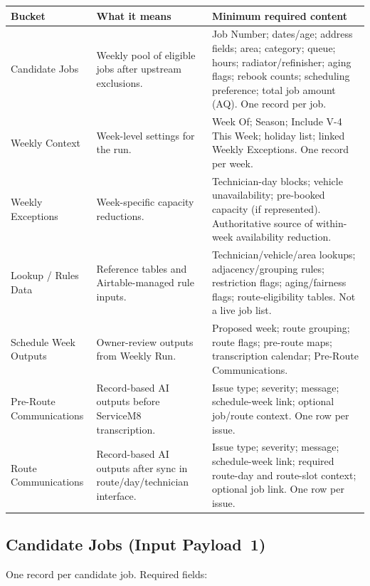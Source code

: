 \documentclass[12pt]{article}
\begin{document}
\medskip
{\small
\begin{longtable}{lp{5cm}p{5cm}}
\toprule
\textbf{Bucket} & \textbf{What it means} & \textbf{Minimum required content} \\
\midrule
Candidate Jobs & Weekly pool of eligible jobs after upstream exclusions. & Job Number; dates/age; address fields; area; category; queue; hours; radiator/refinisher; aging flags; rebook counts; scheduling preference; total job amount (AQ). One record per job. \\
Weekly Context & Week-level settings for the run. & Week Of; Season; Include V-4 This Week; holiday list; linked Weekly Exceptions. One record per week. \\
Weekly Exceptions & Week-specific capacity reductions. & Technician-day blocks; vehicle unavailability; pre-booked capacity (if represented). Authoritative source of within-week availability reduction. \\
Lookup / Rules Data & Reference tables and Airtable-managed rule inputs. & Technician/vehicle/area lookups; adjacency/grouping rules; restriction flags; aging/fairness flags; route-eligibility tables. Not a live job list. \\
Schedule Week Outputs & Owner-review outputs from Weekly Run. & Proposed week; route grouping; route flags; pre-route maps; transcription calendar; Pre-Route Communications. \\
Pre-Route Communications & Record-based AI outputs before ServiceM8 transcription. & Issue type; severity; message; schedule-week link; optional job/route context. One row per issue. \\
Route Communications & Record-based AI outputs after sync in route/day/technician interface. & Issue type; severity; message; schedule-week link; required route-day and route-slot context; optional job link. One row per issue. \\
\bottomrule
\end{longtable}
}

\subsection*{Candidate Jobs (Input Payload~1)}

One record per candidate job.  Required fields:
\end{document}
